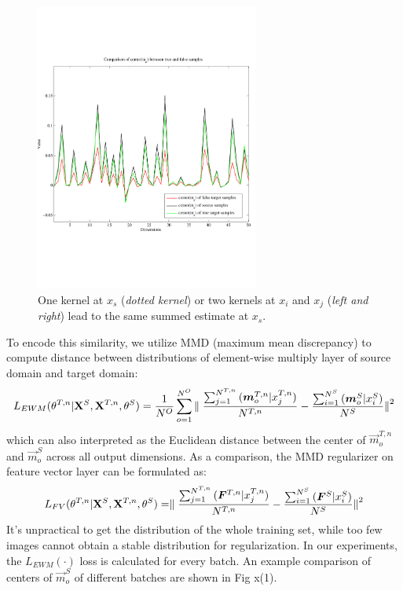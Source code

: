 \documentclass[runningheads]{llncs}
\begin{document}
\begin{figure}
\centering
\includegraphics[height=9.5cm]{images/mmd.pdf}
\caption{One kernel at $x_s$ ({\it dotted kernel}) or two kernels at
$x_i$ and $x_j$ ({\it left and right}) lead to the same summed estimate
at $x_s$. }
\label{fig:example}
\end{figure}

To encode this similarity, we utilize MMD (maximum mean discrepancy) to compute distance between distributions of element-wise multiply layer of source domain and target domain:
\begin{equation}\label{equation:LMMD}
  L_{EWM}(\theta^{T,n}|{\bf X}^{S},{\bf X}^{T,n},\theta^{S}) = \frac{1}{N^{O}} \sum^{N^{O}}_{o=1}{ \parallel \frac{\sum^{N^{T,n}}_{j=1}{(\vec{m}^{T,n}_{o}|x^{T,n}_{j})}}{N^{T,n}} - \frac{\sum^{N^{S}}_{i=1}{(\vec{m}^{S}_{o}|x^{S}_{i})}}{N^{S}} {\parallel}^{2}  }
\end{equation}
which can also interpreted as the Euclidean distance between the center of $\vec{m}^{T,n}_{o}$ and $\vec{m}^{S}_{o}$ across all output dimensions. As a comparison, the MMD regularizer on feature vector layer can be formulated as:
\begin{equation}\label{equation:LMMD}
  L_{FV}(\theta^{T,n}|{\bf X}^{S},{\bf X}^{T,n},\theta^{S}) = \parallel \frac{\sum^{N^{T,n}}_{j=1}{(\vec{F}^{T,n}|x^{T,n}_{j})}}{N^{T,n}} - \frac{\sum^{N^{S}}_{i=1}{(\vec{F}^{S}|x^{S}_{i})}}{N^{S}} {\parallel}^{2}
\end{equation}
It's unpractical to get the distribution of the whole training set, while too few images cannot obtain a stable distribution for regularization. In our experiments, the $L_{EWM}(\cdot)$ loss is calculated for every batch. An example comparison of centers of $\vec{m}^{S}_{o}$ of different batches are shown in Fig x(1).
\end{document}

